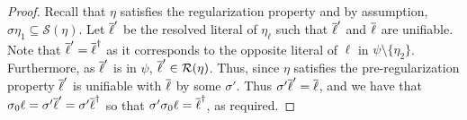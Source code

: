 \begin{proof}
Recall that $\eta$ satisfies the regularization property and by assumption, $\sigma\eta_1\subseteq \mathcal{S}(\eta)$. 
Let $\overline{\ell}'$ be the resolved literal of $\eta_\ell$ such that $\overline{\ell}'$ and $\overline{\ell}$ are unifiable.
Note that $\overline{\ell}'=\overline{\ell}^\dagger$ as it corresponds to the opposite literal of $\ell$ in $\psi \setminus \{\eta_2\}$.  Furthermore, as $\overline{\ell}'$ is in $\psi$, $\overline{\ell}'\in \mathcal{R}(\eta)$. Thus, since $\eta$ satisfies the pre-regularization property $\overline{\ell}'$ is unifiable with $\overline{\ell}$ by some $\sigma'$. Thus $\sigma'\overline{\ell}'=\overline{\ell}$, and we have that $\sigma_0\ell = \sigma'\overline{\ell}'=\sigma'\overline{\ell}^\dagger$ so that $\sigma'\sigma_0\ell = \overline{\ell}^\dagger$, as required.

\end{proof}


